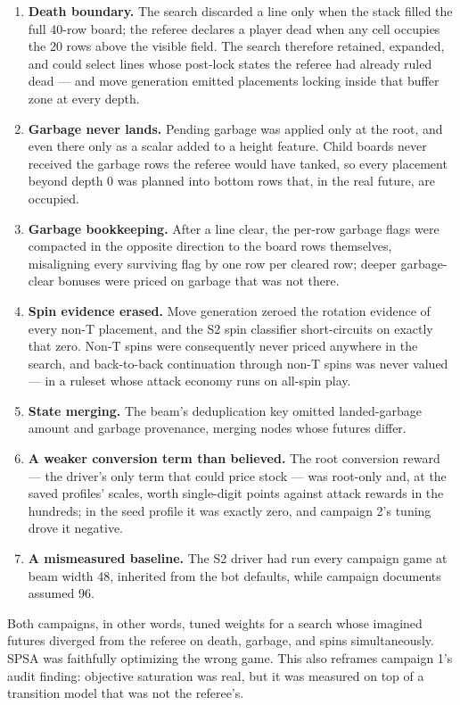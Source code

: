 \documentclass[
  11pt,
]{article}
\providecommand{\tightlist}{%
  \setlength{\itemsep}{0pt}\setlength{\parskip}{0pt}}
\begin{document}
\begin{enumerate}
\def\labelenumi{\arabic{enumi}.}
\tightlist
\item
  \textbf{Death boundary.} The search discarded a line only when the
  stack filled the full 40-row board; the referee declares a player dead
  when any cell occupies the 20 rows above the visible field. The search
  therefore retained, expanded, and could select lines whose post-lock
  states the referee had already ruled dead --- and move generation
  emitted placements locking inside that buffer zone at every depth.
\item
  \textbf{Garbage never lands.} Pending garbage was applied only at the
  root, and even there only as a scalar added to a height feature. Child
  boards never received the garbage rows the referee would have tanked,
  so every placement beyond depth 0 was planned into bottom rows that,
  in the real future, are occupied.
\item
  \textbf{Garbage bookkeeping.} After a line clear, the per-row garbage
  flags were compacted in the opposite direction to the board rows
  themselves, misaligning every surviving flag by one row per cleared
  row; deeper garbage-clear bonuses were priced on garbage that was not
  there.
\item
  \textbf{Spin evidence erased.} Move generation zeroed the rotation
  evidence of every non-T placement, and the S2 spin classifier
  short-circuits on exactly that zero. Non-T spins were consequently
  never priced anywhere in the search, and back-to-back continuation
  through non-T spins was never valued --- in a ruleset whose attack
  economy runs on all-spin play.
\item
  \textbf{State merging.} The beam's deduplication key omitted
  landed-garbage amount and garbage provenance, merging nodes whose
  futures differ.
\item
  \textbf{A weaker conversion term than believed.} The root conversion
  reward --- the driver's only term that could price stock --- was
  root-only and, at the saved profiles' scales, worth single-digit
  points against attack rewards in the hundreds; in the seed profile it
  was exactly zero, and campaign 2's tuning drove it negative.
\item
  \textbf{A mismeasured baseline.} The S2 driver had run every campaign
  game at beam width 48, inherited from the bot defaults, while campaign
  documents assumed 96.
\end{enumerate}

Both campaigns, in other words, tuned weights for a search whose
imagined futures diverged from the referee on death, garbage, and spins
simultaneously. SPSA was faithfully optimizing the wrong game. This also
reframes campaign 1's audit finding: objective saturation was real, but
it was measured on top of a transition model that was not the referee's.
\end{document}
